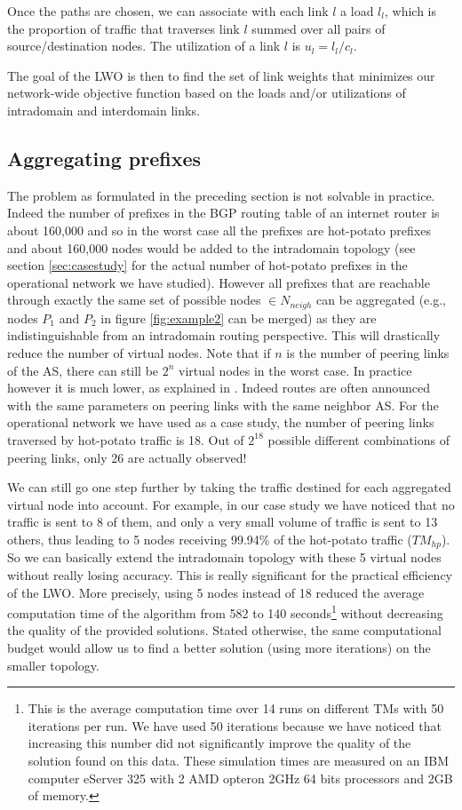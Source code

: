 \documentclass{acm_proc_article-sp}
\begin{document}
Once the paths are chosen, we can associate with each link $l$ a load
$l_l$, which is the proportion of traffic that traverses link $l$ 
summed over all pairs of source/destination nodes.
The utilization of a link $l$ is $u_l = l_l/c_l$.

The goal of the LWO is then to find the set of link weights 
that minimizes our network-wide objective function based on the
loads and/or utilizations of intradomain and interdomain links.

\subsection{Aggregating prefixes}

The problem as formulated in the preceding
section is not solvable in practice. Indeed the number of prefixes in the BGP
routing table of an internet router is about 160,000 and so in the worst
case all the prefixes are hot-potato prefixes and about 160,000 nodes would
be added to the intradomain topology (see section \ref{sec:casestudy}
for the actual number of hot-potato prefixes in the operational
network we have studied).
However all prefixes that are reachable through exactly the same set of possible nodes $\in N_{neigh}$ can be
aggregated (e.g., nodes $P_1$ and $P_2$ in
figure \ref{fig:example2} can be merged) as they are indistinguishable 
from an intradomain routing perspective.
This will drastically reduce the number of virtual
nodes. Note that if $n$ is the number of peering links of
the AS, there can still be $2^n$ virtual nodes in the worst case. 
In practice however it is much lower, as explained in
\cite{feamster2}. Indeed routes are often announced with the same parameters on
peering links with the same neighbor AS.
For the operational network we have used as a case study, 
the number of peering links traversed by hot-potato traffic is 18. 
Out of $2^{18}$ possible different combinations of peering
links, only 26 are actually observed!

We can still go one step further by taking the traffic destined for each
aggregated virtual node into account. For example, in our case study we have noticed that no traffic
is sent to 8 of them, and only a very small volume of traffic is sent to 13 others, 
thus leading to 5 nodes receiving 99.94\% of the hot-potato traffic ($TM_{hp}$). 
So we can basically extend the intradomain topology with these 5 virtual nodes 
without really losing accuracy. This is really significant for the practical efficiency of the LWO.
More precisely, using 5 nodes instead of 18 reduced the average computation time of the algorithm from 582 to 140
seconds\footnote{This is the average computation time 
over 14 runs on different TMs with 50 iterations per run. We have used
50 iterations because we have noticed that increasing this number did
not significantly improve the quality of the solution found on this data. These
simulation times are measured on an IBM computer eServer
325 with 2 AMD opteron 2GHz 64 bits processors and 2GB of memory.} 
without decreasing the quality of the provided solutions.
Stated otherwise, the same computational budget would allow us to find 
a better solution (using more iterations) on the smaller topology.
\end{document}
